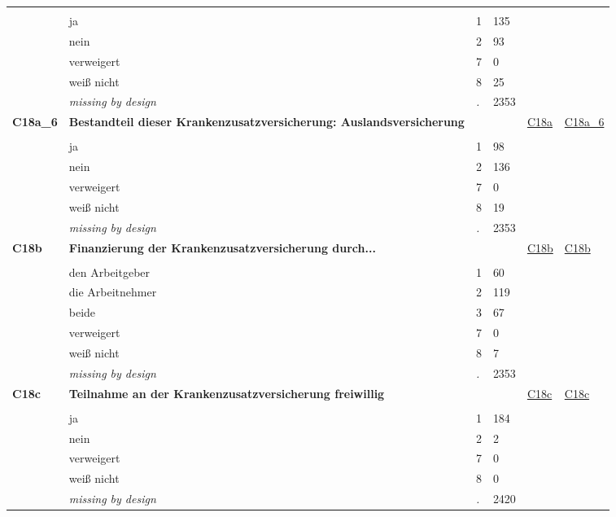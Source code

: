 \begin{longtable}{| L{2.45cm} | L{6cm} | C{1.5cm} | R{1cm} | C{2.25cm} | C{2.25cm} |}
   &  &  &  &  &  \\ 
   & ja & 1 & 135 &  &  \\ 
   & nein & 2 & 93 &  &  \\ 
   & verweigert & 7 & 0 &  &  \\ 
   & weiß nicht & 8 & 25 &  &  \\ 
   & \textit{missing by design} & \textit{.} & 2353 &  &  \\ 
   \midrule
\textbf{C18a\_6}\label{var:C18a:6} & \textbf{Bestandteil dieser Krankenzusatzversicherung: Auslandsversicherung} &  &  & \hyperref[C18a]{C18a} & \hyperref[var:suf:C18a:6]{C18a\_6} \\ 
   &  &  &  &  &  \\ 
   & ja & 1 & 98 &  &  \\ 
   & nein & 2 & 136 &  &  \\ 
   & verweigert & 7 & 0 &  &  \\ 
   & weiß nicht & 8 & 19 &  &  \\ 
   & \textit{missing by design} & \textit{.} & 2353 &  &  \\ 
   \midrule
\textbf{C18b}\label{var:C18b} & \textbf{Finanzierung der Krankenzusatzversicherung durch...} &  &  & \hyperref[C18b]{C18b} & \hyperref[var:suf:C18b]{C18b} \\ 
   &  &  &  &  &  \\ 
   & den Arbeitgeber & 1 & 60 &  &  \\ 
   & die Arbeitnehmer & 2 & 119 &  &  \\ 
   & beide & 3 & 67 &  &  \\ 
   & verweigert & 7 & 0 &  &  \\ 
   & weiß nicht & 8 & 7 &  &  \\ 
   & \textit{missing by design} & \textit{.} & 2353 &  &  \\ 
   \midrule
\textbf{C18c}\label{var:C18c} & \textbf{Teilnahme an der Krankenzusatzversicherung freiwillig} &  &  & \hyperref[C18c]{C18c} & \hyperref[var:suf:C18c]{C18c} \\ 
   &  &  &  &  &  \\ 
   & ja & 1 & 184 &  &  \\ 
   & nein & 2 & 2 &  &  \\ 
   & verweigert & 7 & 0 &  &  \\ 
   & weiß nicht & 8 & 0 &  &  \\ 
   & \textit{missing by design} & \textit{.} & 2420 &  &  \\ 
   \midrule

\end{longtable}

